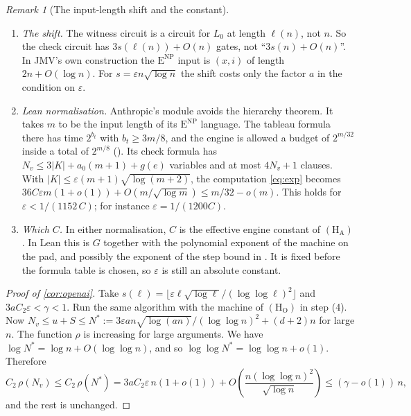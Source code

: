 \documentclass[10pt]{amsart}
\theoremstyle{plain}
\theoremstyle{definition}
\theoremstyle{remark}
\newtheorem{remark}[theorem]{Remark}
\numberwithin{equation}{section}
\newcommand{\ENP}{\mathrm{E}^{\mathrm{NP}}}
\begin{document}
\begin{remark}[The input-length shift and the constant]\label{rem:constant}
\leavevmode
\begin{enumerate}[label=\textup{(\alph*)}]
\item \emph{The shift.} The witness circuit is a circuit for $L_0$ at length $\ell(n)$, not $n$.
So the check circuit has $3s(\ell(n))+O(n)$ gates, not ``$3s(n)+O(n)$''. In JMV's own
construction the $\ENP$ input is $(x,i)$ of length $2n+O(\log n)$. For $s=\varepsilon
n\sqrt{\log n}$ the shift costs only the factor $a$ in the condition on $\varepsilon$.
\item \emph{Lean normalisation.} Anthropic's module avoids the hierarchy theorem. It takes $m$ to be
the input length of its $\ENP$ language. The tableau formula there has time $2^{b_t}$ with
$b_t\ge3m/8$, and the engine is allowed a budget of $2^{m/32}$ inside a total of $2^{m/8}$
(). Its check formula has $N_v\le3|K|+a_0(m+1)+g(e)$ variables and at most
$4N_v+1$ clauses. With $|K|\le\varepsilon(m+1)\sqrt{\log(m+2)}$, the computation
\eqref{eq:exp} becomes $36C\varepsilon m(1+o(1))+O(m/\sqrt{\log m})\le m/32-o(m)$. This holds for
$\varepsilon<1/(1152\,C)$; for instance $\varepsilon=1/(1200C)$.
\item \emph{Which $C$.} In either normalisation, $C$ is the effective engine constant of
$(\mathrm{H}_{\mathrm{A}})$. In Lean this is $G$ together with the polynomial exponent of the
machine on the pad, and possibly the exponent of the step bound in .
It is fixed before the formula table is chosen, so $\varepsilon$ is still an absolute constant.
\end{enumerate}
\end{remark}

\begin{proof}[Proof of \cref{cor:openai}]
Take $s(\ell)=\lfloor\varepsilon\ell\sqrt{\log\ell}/(\log\log\ell)^2\rfloor$ and $3aC_2\varepsilon<\gamma<1$.
Run the same algorithm with the machine of $(\mathrm{H}_{\mathrm{O}})$ in step (4). Now
$N_v\le u+S\le N^\ast:=3\varepsilon an\sqrt{\log(an)}/(\log\log n)^2+(d+2)n$ for large $n$. The
function $\rho$ is increasing for large arguments. We have $\log N^\ast=\log n+O(\log\log n)$, and
so $\log\log N^\ast=\log\log n+o(1)$. Therefore
\[
  C_2\,\rho(N_v)\le C_2\,\rho(N^\ast)=3aC_2\varepsilon\,n(1+o(1))+O\!\left(\frac{n(\log\log n)^2}{\sqrt{\log n}}\right)\le(\gamma-o(1))\,n,
\]
and the rest is unchanged.
\end{proof}
\end{document}
